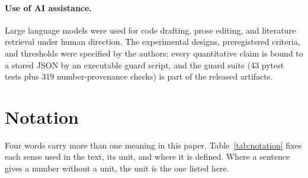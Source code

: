 \documentclass{article}
\begin{document}
\paragraph{Use of AI assistance.} Large language models were used for code drafting, prose editing, and literature retrieval under human direction. The experimental designs, preregistered criteria, and thresholds were specified by the authors; every quantitative claim is bound to a stored JSON by an executable guard script, and the guard suite (43 pytest tests plus 319 number-provenance checks) is part of the released artifacts.




\appendix

\section{Notation}\label{app:notation}
Four words carry more than one meaning in this paper. Table~\ref{tab:notation} fixes each sense used in the text, its unit, and where it is defined. Where a sentence gives a number without a unit, the unit is the one listed here.
\end{document}
